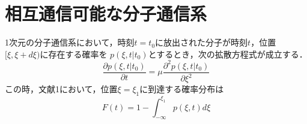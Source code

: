 \documentclass[twocolumn]{jarticle}
\begin{document}
\section{相互通信可能な分子通信系}
1次元の分子通信系において，時刻$t=t_0$に放出された分子が時刻$t$，位置$[\xi,\xi+d\xi)$に存在する確率を
$p(\xi,t|t_0)$とするとき，次の拡散方程式が成立する．
\begin{equation}
    \frac{\partial p(\xi,t|t_0)}{\partial t} = \mu \frac{\partial^2p(\xi,t|t_0)}{\partial\xi^2}
\end{equation}
この時，文献1において，位置$\xi =\xi_1$に到達する確率分布は
\begin{equation}
    F(t) = 1- \int_{-\infty}^{\xi_1} p(\xi,t)d\xi
\end{equation}

\end{document}
